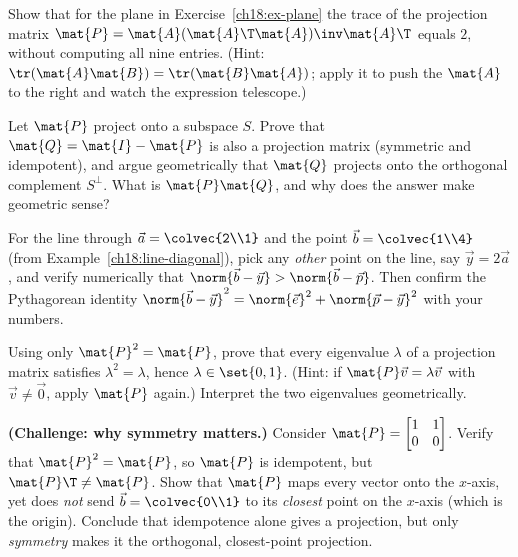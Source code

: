 \begin{exercise}\label{ch18:ex-trace}
Show that for the plane in Exercise~\ref{ch18:ex-plane} the trace of the projection matrix
$\mat{P}=\mat{A}(\mat{A}\T\mat{A})\inv\mat{A}\T$ equals $2$, without computing all nine entries.
(Hint: $\tr(\mat{A}\mat{B})=\tr(\mat{B}\mat{A})$; apply it to push the $\mat{A}$ to the right and
watch the expression telescope.)
\end{exercise}

\begin{exercise}\label{ch18:ex-complement}
Let $\mat{P}$ project onto a subspace $S$. Prove that $\mat{Q}=\mat{I}-\mat{P}$ is also a projection
matrix (symmetric and idempotent), and argue geometrically that $\mat{Q}$ projects onto the
orthogonal complement $S^\perp$. What is $\mat{P}\mat{Q}$, and why does the answer make geometric
sense?
\end{exercise}

\begin{exercise}\label{ch18:ex-closest-num}
For the line through $\vec{a}=\colvec{2\\1}$ and the point $\vec{b}=\colvec{1\\4}$ (from
Example~\ref{ch18:line-diagonal}), pick any \emph{other} point on the line, say $\vec{y}=2\vec{a}$,
and verify numerically that $\norm{\vec{b}-\vec{y}} > \norm{\vec{b}-\vec{p}}$. Then confirm the
Pythagorean identity $\norm{\vec{b}-\vec{y}}^2 = \norm{\vec{e}}^2 + \norm{\vec{p}-\vec{y}}^2$ with
your numbers.
\end{exercise}

\begin{exercise}\label{ch18:ex-eigen}
Using only $\mat{P}^2=\mat{P}$, prove that every eigenvalue $\lambda$ of a projection matrix
satisfies $\lambda^2=\lambda$, hence $\lambda\in\set{0,1}$. (Hint: if $\mat{P}\vec{v}=\lambda\vec{v}$
with $\vec{v}\neq\vec{0}$, apply $\mat{P}$ again.) Interpret the two eigenvalues geometrically.
\end{exercise}

\begin{exercise}\label{ch18:ex-oblique}
\textbf{(Challenge: why symmetry matters.)} Consider $\mat{P}=\begin{bmatrix}1 & 1\\ 0 & 0\end{bmatrix}$.
Verify that $\mat{P}^2=\mat{P}$, so $\mat{P}$ is idempotent, but $\mat{P}\T\neq\mat{P}$. Show that
$\mat{P}$ maps every vector onto the $x$-axis, yet does \emph{not} send $\vec{b}=\colvec{0\\1}$ to
its \emph{closest} point on the $x$-axis (which is the origin). Conclude that idempotence alone
gives a projection, but only \emph{symmetry} makes it the orthogonal, closest-point projection.
\end{exercise}

